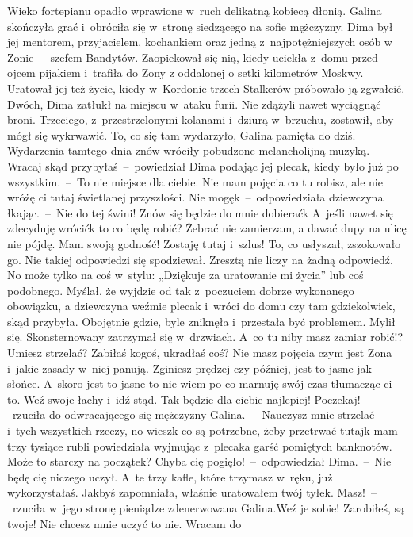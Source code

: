 \documentclass[../MAIN.tex]{subfiles}
\begin{document}
Wieko fortepianu opadło wprawione w~ruch delikatną kobiecą dłonią.
Galina
skończyła grać i~obróciła się w~stronę siedzącego na sofie mężczyzny. Dima był
jej mentorem, przyjacielem, kochankiem oraz jedną z~najpotężniejszych osób w
Zonie~--~szefem Bandytów.
Zaopiekował się nią, kiedy uciekła z~domu przed ojcem pijakiem i~trafiła do Zony
z oddalonej o setki kilometrów Moskwy. Uratował jej też życie, kiedy w~Kordonie
trzech Stalkerów próbowało ją zgwałcić. Dwóch, Dima zatłukł na miejscu w~ataku
furii. Nie zdążyli nawet wyciągnąć broni. Trzeciego, z~przestrzelonymi kolanami i~dziurą w~brzuchu, zostawił, aby mógł się wykrwawić. To, co się tam wydarzyło, Galina pamięta do dziś. Wydarzenia tamtego dnia znów
wróciły pobudzone melancholijną muzyką.
\sx Wracaj skąd przybyłaś~--~powiedział Dima podając jej plecak, kiedy
było już
po wszystkim.~--~To nie miejsce dla ciebie. Nie mam pojęcia co tu robisz, ale
nie wróżę ci tutaj świetlanej przyszłości.
\xx  Nie mogę\3k~--~odpowiedziała dziewczyna łkając.~--~Nie do tej świni! Znów
się będzie do mnie dobierać\3k A~jeśli nawet się
zdecyduję wrócić\3k to co będę robić? Żebrać nie zamierzam, a dawać dupy na
ulicę nie pójdę. Mam swoją godność! Zostaję tutaj i~szlus!
\qm
To, co usłyszał, zszokowało go. Nie takiej odpowiedzi się spodziewał. Zresztą
nie liczy na żadną odpowiedź. No może tylko na coś w~stylu: „Dziękuje za
uratowanie mi życia” lub coś podobnego. Myślał, że wyjdzie od tak z~poczuciem
dobrze wykonanego obowiązku, a dziewczyna weźmie plecak i~wróci do domu czy tam
gdziekolwiek, skąd przybyła. Obojętnie gdzie, byle zniknęła i~przestała być
problemem. Mylił się. Skonsternowany zatrzymał się w~drzwiach.
%
\sx A~co tu niby masz zamiar robić!? Umiesz strzelać? Zabiłaś kogoś, ukradłaś
coś? Nie masz pojęcia czym jest Zona i~jakie zasady w~niej panują. Zginiesz
prędzej czy później, jest to jasne jak słońce. A~skoro jest to jasne to nie wiem
po co marnuję swój czas tłumacząc ci to. Weź swoje łachy i~idź stąd. Tak będzie
dla ciebie najlepiej!
\xx  Poczekaj!~--~rzuciła do odwracającego się mężczyzny Galina.~--~Nauczysz mnie
strzelać i~tych wszystkich rzeczy, no wiesz\3k co są
potrzebne, żeby przetrwać tutaj\3k mam trzy tysiące rubli \x
powiedziała wyjmując z~plecaka garść pomiętych banknotów. Może to starczy na
początek?
\xx  Chyba cię pogięło!~--~odpowiedział Dima.~--~Nie będę cię niczego uczył. A~te
trzy kafle, które trzymasz w~ręku, już
wykorzystałaś. Jakbyś zapomniała, właśnie uratowałem twój tyłek.
\xx  Masz!~--~rzuciła w~jego stronę pieniądze zdenerwowana Galina.Weź je sobie!
Zarobiłeś, są twoje! Nie chcesz mnie uczyć to nie. Wracam do
\end{document}
